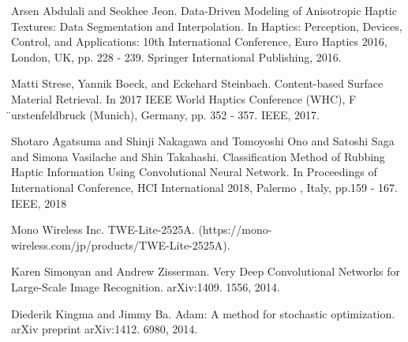\documentclass[letterpaper,  10 pt,  conference]{ieeeconf}  %
\begin{document}














\begin{thebibliography}{99}

     Arsen Abdulali and Seokhee Jeon. Data-Driven Modeling of Anisotropic Haptic Textures: Data Segmentation and Interpolation. In Haptics: Perception,  Devices,  Control, and Applications: 10th International Conference,  Euro
    Haptics 2016,  London,  UK,  pp. 228 - 239. Springer International Publishing,  2016.

    Matti Strese,  Yannik Boeck,  and Eckehard Steinbach. Content-based Surface Material Retrieval. In 2017 IEEE World Haptics Conference (WHC),  F ̈urstenfeldbruck (Munich),  Germany,  pp. 352 - 357. IEEE,  2017.
    
    Shotaro Agatsuma and Shinji Nakagawa and Tomoyoshi Ono and Satoshi Saga and Simona Vasilache and Shin Takahashi. Classification Method of Rubbing Haptic Information Using Convolutional Neural Network. In Proceedings of
     International Conference,  HCI International 2018,  Palermo , Italy,  pp.159 - 167. IEEE, 2018
   
    
 
     Mono Wireless Inc. TWE-Lite-2525A. (https://mono-wireless.com/jp/products/TWE-Lite-2525A).

     Karen Simonyan and Andrew Zisserman. Very Deep Convolutional Networks for Large-Scale Image Recognition. arXiv:1409. 1556,  2014. 

    Diederik Kingma and Jimmy Ba. Adam: A method for stochastic optimization. arXiv preprint arXiv:1412. 6980, 2014. 
\end{thebibliography}
\end{document}
